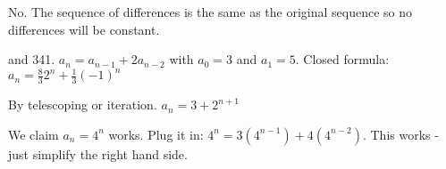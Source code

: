 \documentclass[11pt]{exam}
\def\d{\displaystyle}
\begin{document}
\begin{questions}


\question 
{}

\question No.  The sequence of differences is the same as the original sequence so no differences will be constant.  

 and 341.  $a_n = a_{n-1} + 2a_{n-2}$ with $a_0 = 3$ and $a_1 = 5$.  Closed formula: $a_n = \frac{8}{3}2^n + \frac{1}{3}(-1)^n$

\question By telescoping or iteration.  $a_n = 3 + 2^{n+1}$

\question We claim $a_n = 4^n$ works.  Plug it in: $4^n = 3(4^{n-1}) + 4(4^{n-2})$.  This works - just simplify the right hand side.


\end{questions}
\end{document}
